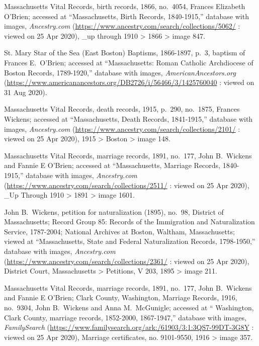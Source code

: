 \begin{thebibliography}{999}

Massachusetts Vital Records, birth records, 1866, no.\ 4054, Frances Elizabeth O'Brien; accessed at ``Massachusetts, Birth Records, 1840-1915,'' database with images, \textit{Ancestry.com} (\url{https://www.ancestry.com/search/collections/5062/} : viewed on 25 Apr 2020), \_up through 1910 > 1866 > image 847.

St. Mary Star of the Sea (East Boston) Baptisms, 1866-1897, p.\ 3, baptism of Frances E.\ O'Brien; accessed at ``Massachusetts: Roman Catholic Archdiocese of Boston Records, 1789-1920,'' database with images, \textit{AmericanAncestors.org} (\url{https://www.americanancestors.org/DB2726/i/56466/3/1425760040} : viewed on 31 Aug 2020).

Massachusetts Vital Records, death records, 1915, p.\ 290, no.\ 1875, Frances Wickens; accessed at ``Massachusetts, Death Records, 1841-1915,'' database with images, \textit{Ancestry.com} (\url{https://www.ancestry.com/search/collections/2101/} : viewed on 25 Apr 2020), 1915 > Boston > image 148.

Massachusetts Vital Records, marriage records, 1891, no.\ 177, John B.\ Wickens and Fannie E O'Brien; accessed at ``Massachusetts, Marriage Records, 1840-1915,'' database with images, \textit{Ancestry.com} (\url{https://www.ancestry.com/search/collections/2511/} : viewed on 25 Apr 2020), \_Up Through 1910 > 1891 > image 1601.

John B.\ Wickens, petition for naturalization (1895), no.\ 98, District of Massachusetts; Record Group 85: Records of the Immigration and Naturalization Service, 1787-2004; National Archives at Boston, Waltham, Massachusetts; viewed at ``Massachusetts, State and Federal Naturalization Records, 1798-1950,'' database with images, \textit{Ancestry.com} (\url{https://www.ancestry.com/search/collections/2361/} : viewed on 25 Apr 2020), District Court, Massachusetts > Petitions, V 203, 1895 > image 211.

Massachusetts Vital Records, marriage records, 1891, no.\ 177, John B.\ Wickens and Fannie E O'Brien; Clark County, Washington, Marriage Records, 1916, no.\ 9304, John B.\ Wickens and Anna M.\ McGunigle; accessed at `` Washington, Clark County, marriage records, 1852-2000, 1867-1947,'' database with images, \textit{FamilySearch} (\url{https://www.familysearch.org/ark:/61903/3:1:3QS7-99DT-3G8Y} : viewed on 25 Apr 2020), Marriage certificates, no. 9101-9550, 1916 > image 357.


\end{thebibliography}
